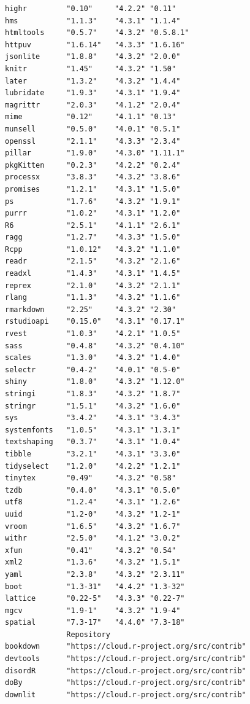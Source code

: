 \documentclass[
  letterpaper,
  DIV=11,
  numbers=noendperiod]{scrreprt}
\begin{document}
\begin{verbatim}
highr         "0.10"     "4.2.2" "0.11"    
hms           "1.1.3"    "4.3.1" "1.1.4"   
htmltools     "0.5.7"    "4.3.2" "0.5.8.1" 
httpuv        "1.6.14"   "4.3.3" "1.6.16"  
jsonlite      "1.8.8"    "4.3.2" "2.0.0"   
knitr         "1.45"     "4.3.2" "1.50"    
later         "1.3.2"    "4.3.2" "1.4.4"   
lubridate     "1.9.3"    "4.3.1" "1.9.4"   
magrittr      "2.0.3"    "4.1.2" "2.0.4"   
mime          "0.12"     "4.1.1" "0.13"    
munsell       "0.5.0"    "4.0.1" "0.5.1"   
openssl       "2.1.1"    "4.3.3" "2.3.4"   
pillar        "1.9.0"    "4.3.0" "1.11.1"  
pkgKitten     "0.2.3"    "4.2.2" "0.2.4"   
processx      "3.8.3"    "4.3.2" "3.8.6"   
promises      "1.2.1"    "4.3.1" "1.5.0"   
ps            "1.7.6"    "4.3.2" "1.9.1"   
purrr         "1.0.2"    "4.3.1" "1.2.0"   
R6            "2.5.1"    "4.1.1" "2.6.1"   
ragg          "1.2.7"    "4.3.3" "1.5.0"   
Rcpp          "1.0.12"   "4.3.2" "1.1.0"   
readr         "2.1.5"    "4.3.2" "2.1.6"   
readxl        "1.4.3"    "4.3.1" "1.4.5"   
reprex        "2.1.0"    "4.3.2" "2.1.1"   
rlang         "1.1.3"    "4.3.2" "1.1.6"   
rmarkdown     "2.25"     "4.3.2" "2.30"    
rstudioapi    "0.15.0"   "4.3.1" "0.17.1"  
rvest         "1.0.3"    "4.2.1" "1.0.5"   
sass          "0.4.8"    "4.3.2" "0.4.10"  
scales        "1.3.0"    "4.3.2" "1.4.0"   
selectr       "0.4-2"    "4.0.1" "0.5-0"   
shiny         "1.8.0"    "4.3.2" "1.12.0"  
stringi       "1.8.3"    "4.3.2" "1.8.7"   
stringr       "1.5.1"    "4.3.2" "1.6.0"   
sys           "3.4.2"    "4.3.1" "3.4.3"   
systemfonts   "1.0.5"    "4.3.1" "1.3.1"   
textshaping   "0.3.7"    "4.3.1" "1.0.4"   
tibble        "3.2.1"    "4.3.1" "3.3.0"   
tidyselect    "1.2.0"    "4.2.2" "1.2.1"   
tinytex       "0.49"     "4.3.2" "0.58"    
tzdb          "0.4.0"    "4.3.1" "0.5.0"   
utf8          "1.2.4"    "4.3.1" "1.2.6"   
uuid          "1.2-0"    "4.3.2" "1.2-1"   
vroom         "1.6.5"    "4.3.2" "1.6.7"   
withr         "2.5.0"    "4.1.2" "3.0.2"   
xfun          "0.41"     "4.3.2" "0.54"    
xml2          "1.3.6"    "4.3.2" "1.5.1"   
yaml          "2.3.8"    "4.3.2" "2.3.11"  
boot          "1.3-31"   "4.4.2" "1.3-32"  
lattice       "0.22-5"   "4.3.3" "0.22-7"  
mgcv          "1.9-1"    "4.3.2" "1.9-4"   
spatial       "7.3-17"   "4.4.0" "7.3-18"  
              Repository                               
bookdown      "https://cloud.r-project.org/src/contrib"
devtools      "https://cloud.r-project.org/src/contrib"
disordR       "https://cloud.r-project.org/src/contrib"
doBy          "https://cloud.r-project.org/src/contrib"
downlit       "https://cloud.r-project.org/src/contrib"

\end{verbatim}
\end{document}
